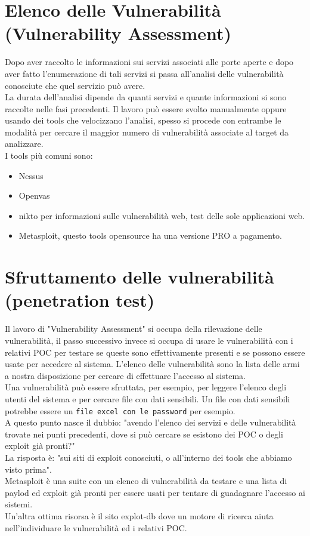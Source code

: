 \documentclass[a4paper,12pt]{article}
\begin{document}
\section{ Elenco delle Vulnerabilità (Vulnerability Assessment) }

Dopo aver raccolto le informazioni sui servizi associati alle porte aperte e dopo aver fatto l'enumerazione di tali servizi si passa all'analisi delle vulnerabilità conosciute che quel servizio può avere.\\
La durata dell'analisi dipende da quanti servizi e quante informazioni si sono raccolte nelle fasi precedenti.
Il lavoro può essere svolto manualmente oppure usando dei tools che velocizzano l'analisi, spesso si procede con entrambe le modalità per cercare il maggior numero di vulnerabilità associate al target da analizzare. \\
I tools più comuni sono:
\begin{itemize}
   
  \item Nessus\cite{nessus}
  \item Openvas \cite{openvas}
  \item nikto\cite{nikto} per informazioni sulle vulnerabilità web, test delle sole applicazioni web.
  \item Metasploit\cite{metasploit}, questo tools opensource ha una versione PRO a pagamento.
\end{itemize}

\section{  Sfruttamento delle vulnerabilità (penetration test) }

Il lavoro di "Vulnerability Assessment" si occupa della rilevazione delle vulnerabilità, il passo successivo invece si occupa di usare le vulnerabilità con i relativi POC per testare se queste sono effettivamente presenti e se possono essere usate per accedere al sistema. L'elenco delle vulnerabilità sono la lista delle armi a nostra disposizione per cercare di effettuare l'accesso al sistema.\\ 
Una vulnerabilità può essere sfruttata, per esempio, per leggere l'elenco degli utenti del sistema e per cercare file con dati sensibili. Un file con dati sensibili potrebbe essere un \texttt{file excel con le password} per esempio. \\ 
A questo punto nasce il dubbio: "avendo l'elenco dei servizi e delle vulnerabilità trovate nei punti precedenti, dove si può cercare se esistono dei POC o degli exploit già pronti?" \\
La risposta è: "sui siti di exploit conosciuti, o all'interno dei tools che abbiamo visto prima". \\ Metasploit\cite{metasploit} è una suite con un elenco di vulnerabilità da testare e una lista di  paylod ed exploit già pronti per essere usati per tentare di guadagnare l'accesso ai sistemi. \\
Un'altra ottima risorsa è il sito explot-db\cite{explot-db} dove un motore di ricerca aiuta nell'individuare le vulnerabilità ed i relativi POC.
\end{document}
